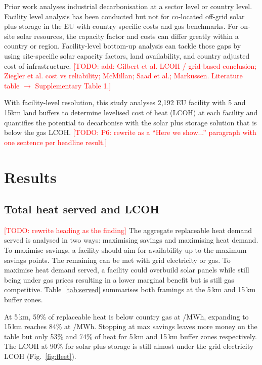 \documentclass[11pt]{article}
\newcommand{\todo}[1]{\textcolor{red}{[TODO: #1]}}
\begin{document}
Prior work analyses industrial decarbonisation at a sector level or country level\cite{rosenow2025nrct,agora2026business}. Facility level analysis has been conducted but not for co-located off-grid solar plus storage in the EU with country specific costs and gas benchmarks\cite{chojkiewicz2026,hotmaps2018}. For on-site solar resources, the capacity factor and costs can differ greatly within a country or region. Facility-level bottom-up analysis can tackle those gaps\cite{neuwirth2024} by using site-specific solar capacity factors, land availability, and country adjusted cost of infrastructure.
\todo{add: Gilbert et al. LCOH / grid-based conclusion\cite{gilbert2023lcoh}; Ziegler et al. cost vs reliability\cite{ziegler2019storage}; McMillan; Saad et al.; Markussen. Literature table $\rightarrow$ Supplementary Table 1.}

With facility-level resolution, this study analyses 2,192 EU facility with 5 and 15km land buffers to determine levelised cost of heat (LCOH) at each facility and quantifies the potential to decarbonise with the solar plus storage solution that is below the gas LCOH.
\todo{P6: rewrite as a ``Here we show...'' paragraph with one sentence per headline result.}

\section*{Results}

\subsection*{Total heat served and LCOH}
\todo{rewrite heading as the finding}
The aggregate replaceable heat demand served is analysed in two ways: maximising savings and maximising heat demand. To maximise savings, a facility should aim for availability up to the maximum savings points. The remaining can be met with grid electricity or gas. To maximise heat demand served, a facility could overbuild solar panels while still being under gas prices resulting in a lower marginal benefit but is still gas competitive. Table~\ref{tab:served} summarises both framings at the 5\,km and 15\,km buffer zones.

At 5\,km, 59\% of replaceable heat is below country gas at /MWh, expanding to 15\,km reaches 84\% at /MWh. Stopping at max savings leaves more money on the table but only 53\% and 74\% of heat for 5\,km and 15\,km buffer zones respectively. The LCOH at 90\% for solar plus storage is still almost  under the grid electricity LCOH (Fig.~\ref{fig:fleet}).
\end{document}
